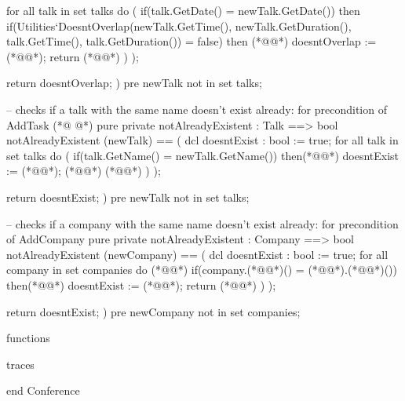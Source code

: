 \begin{vdmpp}[breaklines=true]
    for all talk in set talks do (
     if(talk.GetDate() = newTalk.GetDate())
      then if(Utilities`DoesntOverlap(newTalk.GetTime(), newTalk.GetDuration(), talk.GetTime(), talk.GetDuration()) = false)
           then 
           (*@\vdmnotcovered{(}@*)
              doesntOverlap := (*@@*);
              return (*@@*)
           )
     );
     
     return doesntOverlap;
    )
    pre newTalk not in set talks;
    
  -- checks if a talk with the same name doesn't exist already: for precondition of AddTask
(*@
\label{notAlreadyExistent:157}
@*)
    pure private notAlreadyExistent : Talk ==> bool
    notAlreadyExistent (newTalk) == (
    dcl doesntExist : bool := true;
    for all talk in set talks do (
     if(talk.GetName() = newTalk.GetName())
     then(*@\vdmnotcovered{(}@*)
        doesntExist := (*@@*);
        (*@@*) (*@@*)
       )
     );
     
     return doesntExist;
    )
    pre newTalk not in set talks;
    
   -- checks if a company with the same name doesn't exist already: for precondition of AddCompany
    pure private notAlreadyExistent : Company ==> bool
    notAlreadyExistent (newCompany) == (
    dcl doesntExist : bool := true;
    for all company in set companies do (*@\vdmnotcovered{(}@*)
     if(company.(*@@*)() = (*@@*).(*@@*)())
     then(*@\vdmnotcovered{(}@*)
        doesntExist := (*@@*);
        return (*@@*)
       )
     );
     
     return doesntExist;
    )
    pre newCompany not in set companies;
   
  
functions

traces

end Conference
\end{vdmpp}
\bigskip
